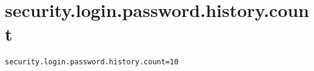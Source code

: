 \section{security.login.password.history.count}
\label{configuration:SecurityLoginPasswordHistoryCount}
\AvailableInJavaOnly{\TODO}
\begin{lstlisting}[style=Props,caption={Usage example for \textit{security.login.password.history.count}}]
security.login.password.history.count=10
\end{lstlisting}